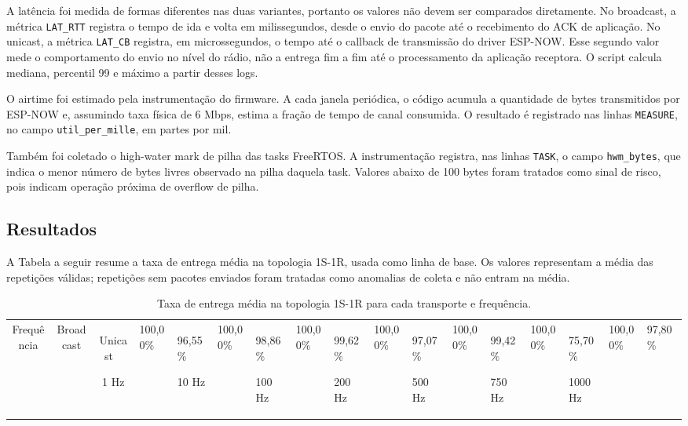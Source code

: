 \documentclass{article}
\begin{document}
    A latência foi medida de formas diferentes nas duas variantes, portanto os valores não devem ser comparados diretamente. No broadcast, a métrica \texttt{LAT_RTT} registra o tempo de ida e volta em milissegundos, desde o envio do pacote até o recebimento do ACK de aplicação. No unicast, a métrica \texttt{LAT_CB} registra, em microssegundos, o tempo até o callback de transmissão do driver ESP-NOW. Esse segundo valor mede o comportamento do envio no nível do rádio, não a entrega fim a fim até o processamento da aplicação receptora. O script calcula mediana, percentil 99 e máximo a partir desses logs.

    O airtime foi estimado pela instrumentação do firmware. A cada janela periódica, o código acumula a quantidade de bytes transmitidos por ESP-NOW e, assumindo taxa física de 6 Mbps, estima a fração de tempo de canal consumida. O resultado é registrado nas linhas \texttt{MEASURE}, no campo \texttt{util_per_mille}, em partes por mil.

    Também foi coletado o high-water mark de pilha das tasks FreeRTOS. A instrumentação registra, nas linhas \texttt{TASK}, o campo \texttt{hwm_bytes}, que indica o menor número de bytes livres observado na pilha daquela task. Valores abaixo de 100 bytes foram tratados como sinal de risco, pois indicam operação próxima de overflow de pilha.

    \subsection{Resultados}

    A Tabela a seguir resume a taxa de entrega média na topologia 1S-1R, usada como linha de base. Os valores representam a média das repetições válidas; repetições sem pacotes enviados foram tratadas como anomalias de coleta e não entram na média.

    \begin{table}[h]

    \centering

    \begin{tabular}{c|c|c}

    \hline

    Frequência & Broadcast & Unicast \

    \hline

    1 Hz & 100,00\% & 96,55\% \

    10 Hz & 100,00\% & 98,86\% \

    100 Hz & 100,00\% & 99,62\% \

    200 Hz & 100,00\% & 97,07\% \

    500 Hz & 100,00\% & 99,42\% \

    750 Hz & 100,00\% & 75,70\% \

    1000 Hz & 100,00\% & 97,80\% \

    \hline

    \end{tabular}

    \caption{Taxa de entrega média na topologia 1S-1R para cada transporte e frequência.}

    \end{table}
\end{document}

